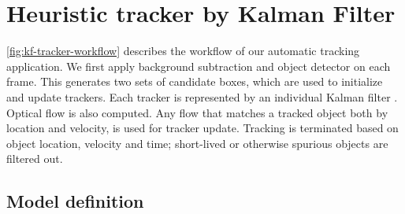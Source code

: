 \section{Heuristic tracker by Kalman Filter}
\label{sec:tracker-kf}


\ref{fig:kf-tracker-workflow} describes the workflow of our automatic tracking application. We first apply background subtraction and object detector on each frame. This generates two sets of candidate boxes, which are used to initialize and update trackers. Each tracker is represented by an individual Kalman filter \cite{grewal2011kalman}. 
Optical flow is also computed. Any flow that matches a tracked object both by location and velocity, is used for tracker update. Tracking is terminated based on object location, velocity and time; short-lived or otherwise spurious objects are filtered out.

\subsection{Model definition}



